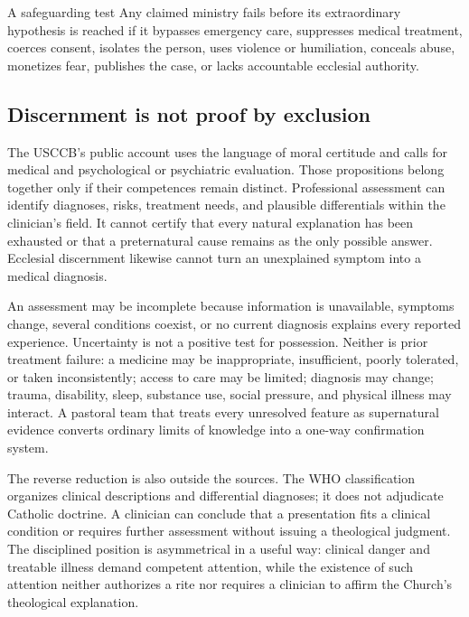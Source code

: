 \begin{studybox}{A safeguarding test}
Any claimed ministry fails before its extraordinary hypothesis is reached if
it bypasses emergency care, suppresses medical treatment, coerces consent,
isolates the person, uses violence or humiliation, conceals abuse, monetizes
fear, publishes the case, or lacks accountable ecclesial authority.
\end{studybox}

\subsection{Discernment is not proof by exclusion}

The USCCB's public account uses the language of moral certitude and calls for
medical and psychological or psychiatric evaluation. Those propositions
belong together only if their competences remain distinct. Professional
assessment can identify diagnoses, risks, treatment needs, and plausible
differentials within the clinician's field. It cannot certify that every
natural explanation has been exhausted or that a preternatural cause remains
as the only possible answer. Ecclesial discernment likewise cannot turn an
unexplained symptom into a medical diagnosis.

An assessment may be incomplete because information is unavailable, symptoms
change, several conditions coexist, or no current diagnosis explains every
reported experience. Uncertainty is not a positive test for possession.
Neither is prior treatment failure: a medicine may be inappropriate,
insufficient, poorly tolerated, or taken inconsistently; access to care may be
limited; diagnosis may change; trauma, disability, sleep, substance use,
social pressure, and physical illness may interact. A pastoral team that
treats every unresolved feature as supernatural evidence converts ordinary
limits of knowledge into a one-way confirmation system.

The reverse reduction is also outside the sources. The WHO classification
organizes clinical descriptions and differential diagnoses; it does not
adjudicate Catholic doctrine. A clinician can conclude that a presentation
fits a clinical condition or requires further assessment without issuing a
theological judgment. The disciplined position is asymmetrical in a useful
way: clinical danger and treatable illness demand competent attention, while
the existence of such attention neither authorizes a rite nor requires a
clinician to affirm the Church's theological explanation.

